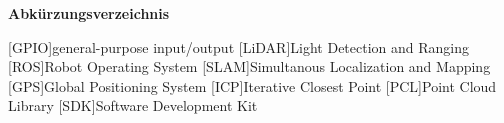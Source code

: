 \Huge\bf Abkürzungsverzeichnis \\
\normalsize\rm

\begin{acronym}

[GPIO]{general-purpose input/output}
[LiDAR]{Light Detection and Ranging}
[ROS]{Robot Operating System}
[SLAM]{Simultanous Localization and Mapping}
[GPS]{Global Positioning System}
[ICP]{Iterative Closest Point}
[PCL]{Point Cloud Library}
[SDK]{Software Development Kit}
    
\end{acronym}

\newpage